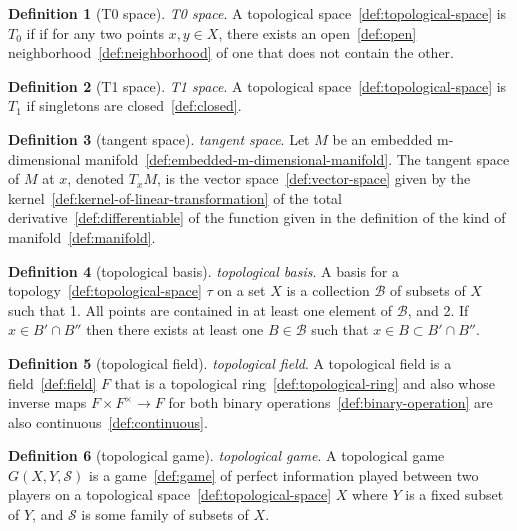 \documentclass[12pt,a4paper]{article}
\theoremstyle{definition}
\newtheorem{definition}{Definition}
\begin{document}
\begin{definition}[T0 space]\label{def:t0-space}
\emph{T0 space}. A topological space~\ref{def:topological-space} is $T_0$ if if for any two points $x,y \in X$, there exists an open~\ref{def:open} neighborhood~\ref{def:neighborhood} of one that does not contain the other.
\end{definition}

\begin{definition}[T1 space]\label{def:t1-space}
\emph{T1 space}. A topological space~\ref{def:topological-space} is $T_1$ if singletons are closed~\ref{def:closed}.
\end{definition}

\begin{definition}[tangent space]\label{def:tangent-space}
\emph{tangent space}. Let $M$ be an embedded m-dimensional manifold~\ref{def:embedded-m-dimensional-manifold}. The tangent space of $M$ at $x$, denoted $T_xM$, is the vector space~\ref{def:vector-space} given by the kernel~\ref{def:kernel-of-linear-transformation} of the total derivative~\ref{def:differentiable} of the function given in the definition of the kind of manifold~\ref{def:manifold}.
\end{definition}

\begin{definition}[topological basis]\label{def:topological-basis}
\emph{topological basis}. A basis for a topology~\ref{def:topological-space} $\tau$ on a set $X$ is a collection $\mathcal B$ of subsets of $X$ such that 
1. All points are contained in at least one element of $\mathcal B$, and
2. If $x\in B'\cap B''$ then there exists at least one $B\in \mathcal B$ such that $x\in B \subset B'\cap B''$.
\end{definition}

\begin{definition}[topological field]\label{def:topological-field}
\emph{topological field}. A topological field is a field~\ref{def:field} $F$ that is a topological ring~\ref{def:topological-ring} and also whose inverse maps $F\times F^\times\to F$ for both binary operations~\ref{def:binary-operation} are also continuous~\ref{def:continuous}.
\end{definition}

\begin{definition}[topological game]\label{def:topological-game}
\emph{topological game}. A topological game $G(X, Y, \mathcal S)$ is a game~\ref{def:game} of perfect information played between two players on a topological space~\ref{def:topological-space} $X$ where $Y$ is a fixed subset of $Y$, and $\mathcal S$ is some family of subsets of $X$.
\end{definition}
\end{document}
